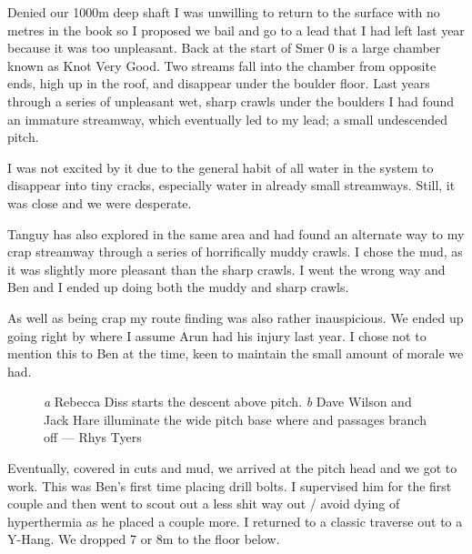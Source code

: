 Denied our 1000m deep shaft I was unwilling to return to the surface with no metres in the book so I proposed we bail and go to a lead that I had left last year because it was too unpleasant. Back at the start of Smer 0 is a large chamber known as Knot Very Good. Two streams fall into the chamber from opposite ends, high up in the roof, and disappear under the boulder floor. Last years through a series of unpleasant wet, sharp crawls under the boulders I had found an immature streamway, which eventually led to my lead; a small undescended pitch.
 
I was not excited by it due to the general habit of all water in the system to disappear into tiny cracks, especially water in already small streamways. Still, it was close and we were desperate.
 
Tanguy has also explored in the same area and had found an alternate way to my crap streamway through a series of horrifically muddy crawls. I chose the mud, as it was slightly more pleasant than the sharp crawls. I went the wrong way and Ben and I ended up doing both the muddy and sharp crawls.
 
As well as being crap my route finding was also rather inauspicious. We ended up going right by where I assume Arun had his injury last year. I chose not to mention this to Ben at the time, keen to maintain the small amount of morale we had.

 \begin{figure*}[t!]
\checkoddpage \ifoddpage \forcerectofloat \else \forceversofloat \fi
\centering
\begin{subfigure}[t]{0.685\textwidth}
\centering
{}
 \caption{}\label{water hallelujah}
\end{subfigure}
    \hfill
    \begin{subfigure}[t]{0.305\textwidth}
        \centering
        \caption{} \label{Diss and Dave}
    \end{subfigure}
    \caption{
    \emph{a} Rebecca Diss starts the descent above  pitch.
    \emph{b} Dave Wilson and Jack Hare illuminate the wide pitch base where  and  passages branch off --- Rhys Tyers}
\end{figure*}
 
Eventually, covered in cuts and mud, we arrived at the pitch head and we got to work. This was Ben’s first time placing drill bolts. I supervised him for the first couple and then went to scout out a less shit way out / avoid dying of hyperthermia as he placed a couple more. I returned to a classic traverse out to a Y-Hang. We dropped 7 or 8m to the floor below.
 
